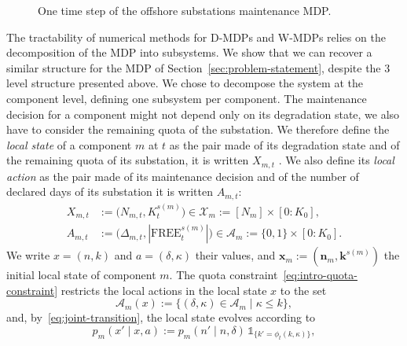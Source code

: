 \documentclass{article}
\begin{document}
\begin{figure}[!htb]
\caption{One time step of the offshore substations maintenance MDP.}
\label{fig:bayesian-network}
\label{fig:mdp-structure}
\end{figure}
The tractability of numerical methods for D-MDPs and W-MDPs relies on the decomposition of the MDP into subsystems. We show that we can recover
a similar structure for the MDP of Section~\ref{sec:problem-statement}, despite the 3 level structure presented above. We chose to decompose the system
at the component level, defining one subsystem per 
component. The maintenance decision for a component might not depend only on its degradation state, we also have to 
consider the remaining quota of the substation. We therefore define the \emph{local state} of a component $m$ at $t$ as the pair
made of its degradation state and of the remaining quota of its substation, it is written $X_{m,t}$ . 
We also define its \emph{local action} as the pair
made of its maintenance decision and of the number of declared days of its substation it is written $A_{m,t}$:
\begin{align*}
X_{m,t} &:= \big(N_{m,t}, K^{s(m)}_t\big) \in \mathcal{X}_m := [N_m] \times [0:K_0], \\
A_{m,t} &:= \big(\Delta_{m,t}, |\text{FREE}^{s(m)}_t|\big) \in \mathcal{A}_m := \{0,1\} \times [0:K_0].
\end{align*}
We write $x = (n, k)$ and $a = (\delta, \kappa)$ their values, and $\mathbf{x}_m := (\mathbf{n}_m,
\mathbf{k}^{s(m)})$ the initial local state of component $m$. The quota constraint~\eqref{eq:intro-quota-constraint}
restricts the local actions in the local state $x$ to the set
\[
\mathcal{A}_m(x) := \big\{ (\delta, \kappa) \in \mathcal{A}_m \mid \kappa \le k \big\},
\]
and, by~\eqref{eq:joint-transition}, the local state evolves according to
\[
p_m(x' \mid x, a) := p_m(n' \mid n, \delta)\, \mathds{1}_{\{k' = \phi_t(k, \kappa)\}},
\]
\end{document}
